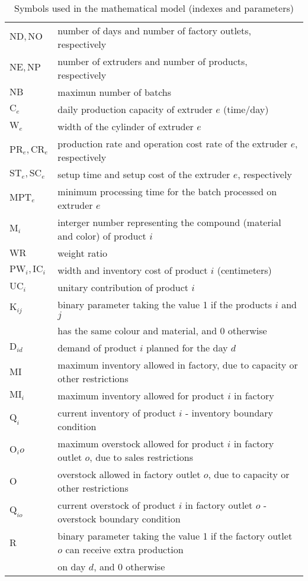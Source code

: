 \begin{table}[h!]
\begin{center}
\begin{tabular}{ l l }
		$\mathrm{ND}, \mathrm{NO}$ & number of days and number of factory outlets, respectively\\
		$\mathrm{NE}, \mathrm{NP}$ & number of extruders and number of products, respectively \\ 
		$\mathrm{NB}$ & maximun number of batchs \\ 
		$\mathrm{C}_e$ & daily production capacity of extruder $e$ (time/day)\\ 
		$\mathrm{W}_e$ & width of the cylinder of extruder $e$ \\ 
		$\mathrm{PR}_e, \mathrm{CR}_e$ & production rate and operation cost rate of the extruder $e$, respectively \\ 
		$\mathrm{ST}_e, \mathrm{SC}_e$ & setup time and setup cost of the extruder $e$, respectively\\ 
		$\mathrm{MPT}_e$ & minimum processing time for the batch processed on extruder $e$ \\ 
		$\mathrm{M}_i$ & interger number representing the compound (material and color) of product $i$ \\ 
		$\mathrm{WR}$ & weight ratio \\ 
		$\mathrm{PW}_i, \mathrm{IC}_i$ & width and inventory cost of product $i$ (centimeters) \\ 
		$\mathrm{UC}_i$ & unitary contribution of product $i$ \\ 
		$\mathrm{K}_{ij}$ & binary parameter taking the value 1 if the products $i$ and $j$ \\
		& has the same colour and material, and 0 otherwise \\
		$\mathrm{D}_{id}$ & demand of product $i$ planned for the day $d$ \\ 
		$\mathrm{MI}$ & maximum inventory allowed in factory, due to capacity or other restrictions \\ 
		$\mathrm{MI}_i$ & maximum inventory allowed for product $i$ in factory \\ 
		$\mathrm{Q}_i$ & current inventory of product $i$ - inventory boundary condition \\ 
		$\mathrm{O}_io$ & maximum overstock allowed for product $i$ in factory outlet $o$, due to sales restrictions \\ 
		$\mathrm{O}$ & overstock allowed in factory outlet $o$, due to capacity or other restrictions  \\ 
		$\mathrm{Q}_{io}$ & current overstock of product $i$ in factory outlet $o$ - overstock boundary condition \\ 
		$\mathrm{R}$ & binary parameter taking the value 1 if the factory outlet $o$ can receive extra production \\ 
		             & on day $d$, and 0 otherwise \\ 
	\end{tabular}
\caption{Symbols used in the mathematical model (indexes and parameters)}
\label{tab:symbols1}
\end{center}
\end{table}

